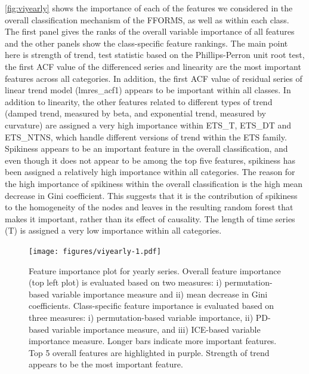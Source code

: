 \documentclass[11pt,a4paper,]{article}
\begin{document}
\autoref{fig:viyearly} shows the importance of each of the features we considered in the overall classification mechanism of the FFORMS, as well as within each class. The first panel gives the ranks of the overall variable importance of all features and the other panels show the class-specific feature rankings. The main point here is strength of trend, test statistic based on the Phillips-Perron unit root test, the first ACF value of the differenced series and linearity are the most important features across all categories.
In addition, the first ACF value of residual series of linear trend model (lmres\_acf1) appears to be important within all classes. In addition to linearity, the other features related to different types of trend (damped trend, measured by beta, and exponential trend, measured by curvature) are assigned a very high importance within ETS\_T, ETS\_DT and ETS\_NTNS, which handle different versions of trend within the ETS family. Spikiness appears to be an important feature in the overall classification, and even though it does not appear to be among the top five features, spikiness has been assigned a relatively high importance within all categories. The reason for the high importance of spikiness within the overall classification is the high mean decrease in Gini coefficient. This suggests that it is the contribution of spikiness to the homogeneity of the nodes and leaves in the resulting random forest that makes it important, rather than its effect of causality. The length of time series (T) is assigned a very low importance within all categories.

\begin{figure}
\centering
\texttt{[image: figures/viyearly-1.pdf]}
\caption{\label{fig:viyearly}Feature importance plot for yearly series. Overall feature importance (top left plot) is evaluated based on two measures: i) permutation-based variable importance measure and ii) mean decrease in Gini coefficients. Class-specific feature importance is evaluated based on three measures: i) permutation-based variable importance, ii) PD-based variable importance measure, and iii) ICE-based variable importance measure. Longer bars indicate more important features. Top 5 overall features are highlighted in purple. Strength of trend appears to be the most important feature.}
\end{figure}
\end{document}
